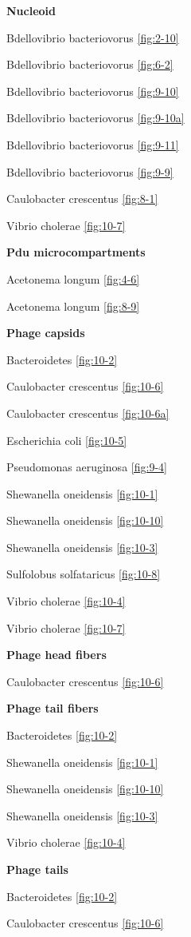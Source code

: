 \documentclass[]{tufte-book}
\begin{document}
\textbf{Nucleoid}

Bdellovibrio bacteriovorus \ref{fig:2-10}

Bdellovibrio bacteriovorus \ref{fig:6-2}

Bdellovibrio bacteriovorus \ref{fig:9-10}

Bdellovibrio bacteriovorus \ref{fig:9-10a}

Bdellovibrio bacteriovorus \ref{fig:9-11}

Bdellovibrio bacteriovorus \ref{fig:9-9}

Caulobacter crescentus \ref{fig:8-1}

Vibrio cholerae \ref{fig:10-7}

\textbf{Pdu microcompartments}

Acetonema longum \ref{fig:4-6}

Acetonema longum \ref{fig:8-9}

\textbf{Phage capsids}

Bacteroidetes \ref{fig:10-2}

Caulobacter crescentus \ref{fig:10-6}

Caulobacter crescentus \ref{fig:10-6a}

Escherichia coli \ref{fig:10-5}

Pseudomonas aeruginosa \ref{fig:9-4}

Shewanella oneidensis \ref{fig:10-1}

Shewanella oneidensis \ref{fig:10-10}

Shewanella oneidensis \ref{fig:10-3}

Sulfolobus solfataricus \ref{fig:10-8}

Vibrio cholerae \ref{fig:10-4}

Vibrio cholerae \ref{fig:10-7}

\textbf{Phage head fibers}

Caulobacter crescentus \ref{fig:10-6}

\textbf{Phage tail fibers}

Bacteroidetes \ref{fig:10-2}

Shewanella oneidensis \ref{fig:10-1}

Shewanella oneidensis \ref{fig:10-10}

Shewanella oneidensis \ref{fig:10-3}

Vibrio cholerae \ref{fig:10-4}

\textbf{Phage tails}

Bacteroidetes \ref{fig:10-2}

Caulobacter crescentus \ref{fig:10-6}
\end{document}
